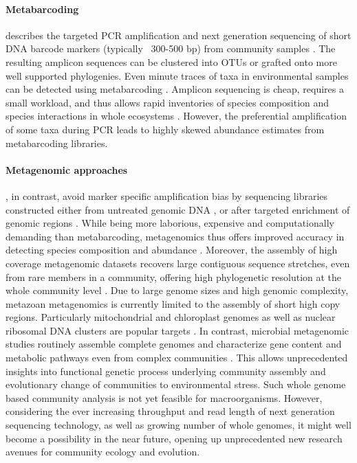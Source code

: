 \documentclass[12pt]{article}
\begin{document}
\paragraph{Metabarcoding} describes the targeted PCR amplification and
next generation sequencing of short DNA barcode markers (typically
~300-500 bp) from community samples \citep{Yu2012, ji2013}. The
resulting amplicon sequences can be clustered into OTUs or grafted
onto more well supported phylogenies. Even minute traces of taxa in
environmental samples can be detected using metabarcoding
\citep{bohmann2014}.  Amplicon sequencing is cheap, requires a small
workload, and thus allows rapid inventories of species composition and
species interactions in whole ecosystems \citep{gibson2014, leray2015,
  pompanon2012}. However, the preferential amplification of some taxa
during PCR leads to highly skewed abundance estimates
\citep{Yu2012, elbrecht2015} from metabarcoding libraries.

\paragraph{Metagenomic approaches}, in contrast, avoid marker specific
amplification bias by sequencing libraries constructed either from
untreated genomic DNA \citep{dodsworth2015, linard2015, tang2014}, or
after targeted enrichment of genomic regions \citep{liu2016}. While
being more laborious, expensive and computationally demanding than
metabarcoding, metagenomics thus offers improved accuracy in detecting
species composition and abundance \citep{zhou2013}. Moreover, the
assembly of high coverage metagenomic datasets recovers large
contiguous sequence stretches, even from rare members in a community,
offering high phylogenetic resolution at the whole community level
\citep{coissac2016}. Due to large genome sizes and high genomic
complexity, metazoan metagenomics is currently limited to the
assembly of short high copy regions. Particularly mitochondrial
and chloroplast genomes as well as nuclear ribosomal DNA clusters are
popular targets \citep{dodsworth2015, coissac2016}. 
In contrast, microbial metagenomic studies routinely assemble complete genomes
and characterize gene content and metabolic pathways even from complex
communities \citep{nielsen2014}. This allows unprecedented insights
into functional genetic process underlying community assembly and
evolutionary change of communities to environmental stress.  Such
whole genome based community analysis is not yet feasible for
macroorganisms. However, considering the ever increasing throughput
and read length of next generation sequencing technology, as well as
growing number of whole genomes, it might well become a possibility in
the near future, opening up unprecedented new research avenues for
community ecology and evolution.
\end{document}
